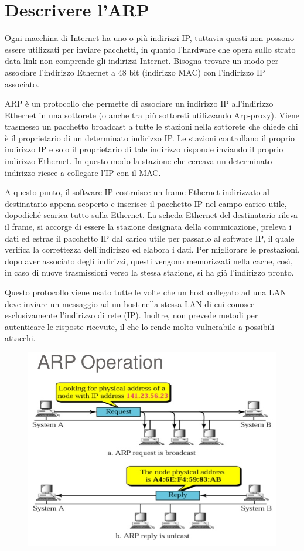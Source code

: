 \section{Descrivere l’ARP}
Ogni macchina di Internet ha uno o più indirizzi IP, tuttavia questi non possono essere utilizzati per inviare pacchetti, in quanto l’hardware che opera sullo strato data link non comprende gli indirizzi Internet.
Bisogna trovare un modo per associare l’indirizzo Ethernet a 48 bit (indirizzo MAC) con l’indirizzo IP associato.

ARP è un protocollo che permette di associare un indirizzo IP all’indirizzo Ethernet in una sottorete (o anche tra più sottoreti utilizzando Arp-proxy).
Viene trasmesso un pacchetto broadcast a tutte le stazioni nella sottorete che chiede chi è il proprietario di un determinato indirizzo IP. Le stazioni controllano il proprio indirizzo IP e solo il proprietario di tale indirizzo risponde inviando il proprio indirizzo Ethernet. In questo modo la stazione che cercava un determinato indirizzo riesce a collegare l’IP con il MAC.

A questo punto, il software IP costruisce un frame Ethernet indirizzato al destinatario appena scoperto e inserisce il pacchetto IP nel campo carico utile, dopodiché scarica tutto sulla Ethernet. 
La scheda Ethernet del destinatario rileva il frame, si accorge di essere la stazione designata della comunicazione, preleva i dati ed estrae il pacchetto IP dal carico utile per passarlo al software IP, il quale verifica la correttezza dell’indirizzo ed elabora i dati.
Per migliorare le prestazioni, dopo aver associato degli indirizzi, questi vengono memorizzati nella cache, così, in caso di nuove trasmissioni verso la stessa stazione, si ha già l’indirizzo pronto.

Questo protocollo viene usato tutte le volte che un host collegato ad una LAN deve inviare un messaggio ad un host nella stessa LAN di cui conosce esclusivamente l’indirizzo di rete (IP). Inoltre, non prevede metodi per autenticare le risposte ricevute, il che lo rende molto vulnerabile a possibili attacchi.

\begin{figure}[H]
\centering
\includegraphics[scale=0.6]{res/img/43_ARP.png}
\end{figure}

